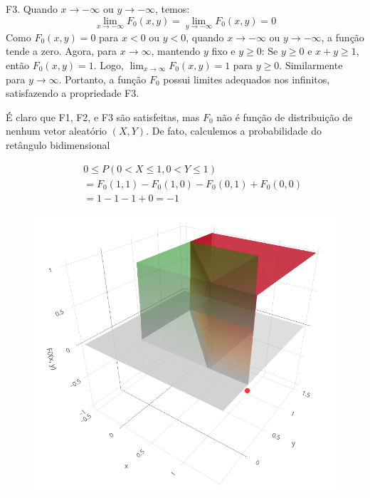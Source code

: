 \begin{frame}
F3. Quando \( x \to -\infty \) ou \( y \to -\infty \), temos: \[
\lim_{x \to -\infty} F_0(x, y) = \lim_{y \to -\infty} F_0(x, y) = 0
\]	 Como \( F_0(x, y) = 0 \) para \( x < 0 \) ou \( y < 0 \), quando \( x \to -\infty \) ou \( y \to -\infty \), a função tende a zero. Agora, para \( x \to \infty \), mantendo \( y \) fixo e \( y \geq 0 \): Se \( y \geq 0 \) e \( x + y \geq 1 \), então \( F_0(x, y) = 1 \). Logo, \( \lim_{x \to \infty} F_0(x, y) = 1 \) para \( y \geq 0 \). Similarmente para \( y \to \infty \). Portanto, a função \( F_0 \) possui limites adequados nos infinitos, satisfazendo a propriedade F3.

\bigskip
É claro que F1, F2, e F3 são satisfeitas, mas $F_0$ não é função de distribuição de nenhum vetor aleatório $(X,Y)$. De fato, calculemos a probabilidade do retângulo bidimensional 


\begin{eqnarray}
	& & 0\leq P(0 <X\leq 1,0<Y\leq 1)\nonumber\\
	& & =F_0(1,1)-F_0(1,0)-F_0(0,1)+F_0(0,0)\nonumber \\
	& & =1-1-1+0=-1 \nonumber
\end{eqnarray}
\end{frame}	

\begin{frame}
	\begin{figure}[!htb]
		\begin{center}
			\includegraphics[scale=0.3]{Fig0-Pr.png}
		\end{center}
	\end{figure}
\end{frame}	


